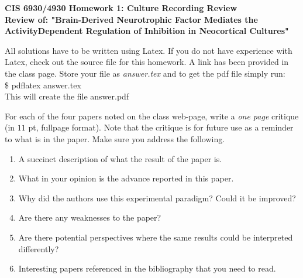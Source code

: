\documentclass[11pt]{article}
\begin{document}
\begin{center}
{\large {\bf CIS 6930/4930 Homework 1: Culture Recording Review}}\\
{\normalsize {\bf Review of: "Brain-Derived Neurotrophic Factor Mediates the ActivityDependent
Regulation of Inhibition in Neocortical Cultures"}}
\end{center}

All solutions have to be written using Latex. If you do not have experience
with Latex, check out the source file for this homework. A link has been
provided in the class page. Store your file as {\em answer.tex} and to get
the pdf file simply run:\\
\$ pdflatex answer.tex\\
This will create the file answer.pdf

For each of the four papers noted on the class web-page, write a {\em one page}
critique (in $11$ pt, fullpage format). Note that the critique is for future
use as a reminder to what is in the paper. Make sure you address the following.

\begin{enumerate}
\item A succinct description of what the result of the paper is.
\item What in your opinion is the advance reported in this paper.
\item Why did the authors use this experimental paradigm? Could it be improved?
\item Are there any weaknesses to the paper?
\item Are there potential perspectives where the same results could be
interpreted differently?
\item Interesting papers referenced in the bibliography that you need to read.
\end{enumerate}
\end{document}
